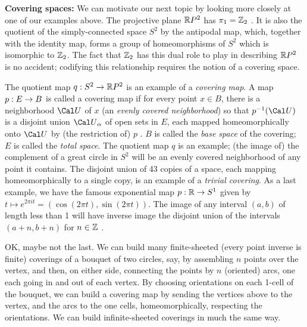 {\bf Covering spaces:} We can motivate our next topic by looking more
closely at one of our examples above. The projective plane ${\Bbb R}P^2$
has $\pi_1 = {\Bbb Z}_2$ . It is also the quotient of the simply-connected
space $S^2$ by the antipodal map, which, together with the identity map,
forms a group of homeomorphisms of $S^2$ which is isomorphic to ${\Bbb Z}_2$.
The fact that ${\Bbb Z}_2$ has this dual role to play in describing 
${\Bbb R}P^2$ is no accident; codifying this relationship requires the 
notion of a covering space.

\msk

The quotient map $q:S^2\rightarrow {\Bbb R}P^2$ is an example of a {\it covering map}.
A map $p:E\rightarrow B$ is called a covering map if for every point $x\in B$, there
is a neighborhood ${\Cal U}$ of $x$ (an
{\it evenly covered neighborhood}) so that $p^{-1}({\Cal U})$ 
is a disjoint union ${\Cal U}_\alpha$ of open sets in $E$, each mapped
homeomorphically onto ${\Cal U}$ by (the restriction of) $p$ . $B$ is
called the {\it base space} of the covering; $E$ is called the {\it total
space}. The quotient map $q$ is an example; (the image of) the complement
of a great circle in $S^2$ will be an evenly covered neighborhood
of any point it contains. The disjoint union of 43 copies of a space,
each mapping homeomorphically to a single copy, is an example of a 
{\it trivial covering}. As a last example, we have the famous 
exponential map $p:{\Bbb R}\rightarrow S^1$ given by $t\mapsto e^{2\pi it} = 
(\cos (2\pi t),\sin (2\pi t))$. The image of any interval $(a,b)$ of length
less than 1 will have inverse image the disjoint union of the
intervals $(a+n,b+n)$ for $n\in{\Bbb Z}$ .

\msk

OK, maybe not the last. We can build many finite-sheeted (every point
inverse is finite) coverings of a bouquet of two circles, say, by 
assembling $n$ points over the vertex, and then, on either side,
connecting the points by $n$ (oriented) arcs, one each going in and out of
each vertex. By choosing orientations on each 1-cell of the bouquet,
we can build a covering map by sending the vertices above to the
vertex, and the arcs to the one cells, homeomorphically, respecting 
the orientations. We can build infinite-sheeted coverings in much 
the same way.

\msk

\leavevmode


\epsfxsize=3in


\bsk

